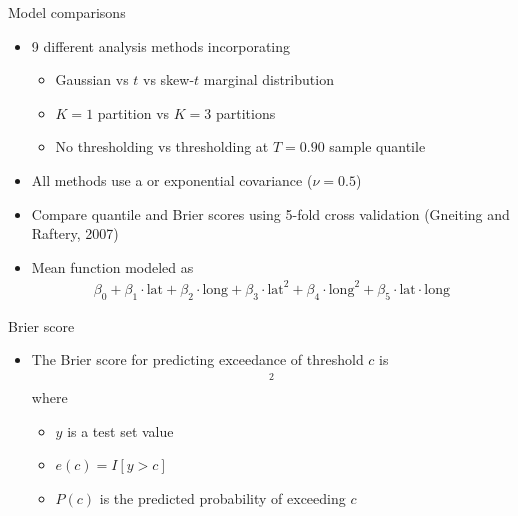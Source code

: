 \documentclass{beamer}
\begin{document}
\begin{frame}{Model comparisons}
  \begin{itemize} \setlength{\itemsep}{0.5em}
    \item 9 different analysis methods incorporating
    \begin{itemize}
      \item Gaussian vs $t$ vs skew-$t$ marginal distribution
      \item $K=1$ partition vs $K=3$ partitions
      \item No thresholding vs thresholding at $T=0.90$ sample quantile
    \end{itemize}
    \item All methods use a \Matern or exponential covariance ($\nu = 0.5$)
    \item Compare quantile and Brier scores using 5-fold cross validation (Gneiting and Raftery, 2007)
    \item Mean function modeled as
    \begin{align*}
    	\beta_0 + \beta_1 \cdot \text{lat} + \beta_2 \cdot \text{long} +  \beta_3 \cdot \text{lat}^2 + \beta_4 \cdot \text{long}^2 + \beta_5 \cdot \text{lat} \cdot \text{long}
    \end{align*}
   \end{itemize}
\end{frame}


\begin{frame}{Brier score}
  \begin{itemize} \setlength{\itemsep}{0.5em}
	\item The Brier score for predicting exceedance of threshold $c$ is
	\begin{align*}
	  [e(c) - P(c)]^2
	\end{align*}
	where
	\begin{itemize}
		\item $y$ is a test set value
		\item $e(c) = I[y > c]$
		\item $P(c)$ is the predicted probability of exceeding $c$
	\end{itemize}
  \end{itemize}
\end{frame}
\end{document}
